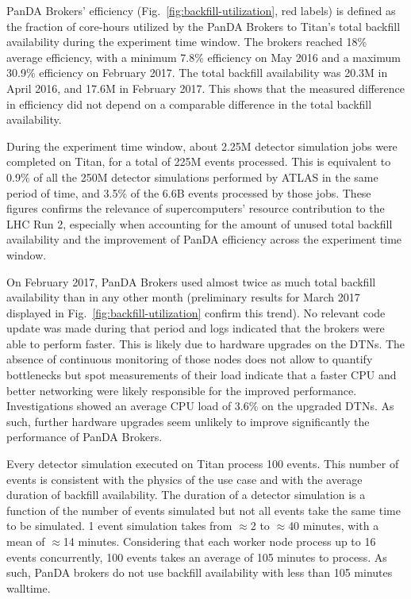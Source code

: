 PanDA Brokers' efficiency (Fig.~\ref{fig:backfill-utilization}, red labels) is
defined as the fraction of core-hours utilized by the PanDA Brokers to  Titan’s
total backfill availability during the experiment time window. The brokers
reached 18\% average efficiency, with a minimum 7.8\% efficiency on May 2016 and
a maximum 30.9\% efficiency on February 2017. The total backfill availability
was 20.3M in April 2016, and 17.6M in February 2017. This shows that the
measured difference in efficiency did not depend on a comparable difference in
the total backfill availability.

During the experiment time window, about 2.25M detector simulation jobs were
completed on Titan, for a total of 225M events processed. This is equivalent to
0.9\% of all the 250M detector simulations performed by ATLAS in the same period
of time, and 3.5\% of the 6.6B events processed by those jobs. These figures
confirms the relevance of supercomputers' resource contribution to the LHC Run
2, especially when accounting for the amount of unused total backfill
availability and the improvement of PanDA efficiency across the experiment time
window.

On February 2017, PanDA Brokers used almost twice as much total backfill
availability than in any other month (preliminary results for March 2017
displayed in Fig.~\ref{fig:backfill-utilization} confirm this trend). No
relevant code update was made during that period and logs indicated that the
brokers were able to perform faster. This is likely due to hardware upgrades on
the DTNs. The absence of continuous monitoring of those nodes does not allow to
quantify bottlenecks but spot measurements of their load indicate that a faster
CPU and better networking were likely responsible for the improved performance.
Investigations showed an average CPU load of 3.6\% on the upgraded DTNs. As
such, further hardware upgrades seem unlikely to improve significantly the
performance of PanDA Brokers.

Every detector simulation executed on Titan process 100 events. This number of
events is consistent with the physics of the use case and with the average
duration of backfill availability. The duration of a detector simulation is a
function of the number of events simulated but not all events take the same time
to be simulated. 1 event simulation takes from $\approx$2 to $\approx$40
minutes, with a mean of $\approx$14 minutes. Considering that each worker node
process up to 16 events concurrently, 100 events takes an average of 105 minutes
to process. As such, PanDA brokers do not use backfill availability with less
than 105 minutes walltime.


